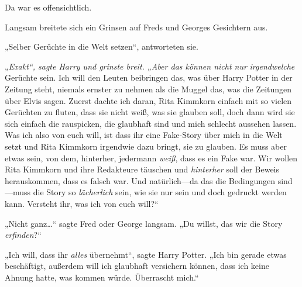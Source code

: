 Da war es offensichtlich.

Langsam breitete sich ein Grinsen auf Freds und Georges Gesichtern aus.

„Selber Gerüchte in die Welt setzen“, antworteten sie.

„\emph{Exakt“, sagte Harry und grinste breit. „Aber das können nicht nur} \emph{irgendwelche} Gerüchte sein. Ich will den Leuten beibringen das, was über Harry Potter in der Zeitung steht, niemals ernster zu nehmen als die Muggel das, was die Zeitungen über Elvis sagen. Zuerst dachte ich daran, Rita Kimmkorn einfach mit so vielen Gerüchten zu fluten, dass sie nicht weiß, was sie glauben soll, doch dann wird sie sich einfach die rauspicken, die glaubhaft sind und mich schlecht aussehen lassen. Was ich also von euch will, ist dass ihr eine Fake-Story über mich in die Welt setzt und Rita Kimmkorn irgendwie dazu bringt, sie zu glauben. Es muss aber etwas sein, von dem, hinterher, jedermann \emph{weiß}, dass es ein Fake war. Wir wollen Rita Kimmkorn und ihre Redakteure täuschen und \emph{hinterher} soll der Beweis herauskommen, dass es falsch war. Und natürlich—da das die Bedingungen sind—muss die Story so \emph{lächerlich} sein, wie sie nur sein und doch gedruckt werden kann. Versteht ihr, was ich von euch will?“

„Nicht ganz…“ sagte Fred oder George langsam. „Du willst, das wir die Story \emph{erfinden}?“

„Ich will, dass ihr \emph{alles} übernehmt“, sagte Harry Potter. „Ich bin gerade etwas beschäftigt, außerdem will ich glaubhaft versichern können, dass ich keine Ahnung hatte, was kommen würde. Überrascht mich.“

